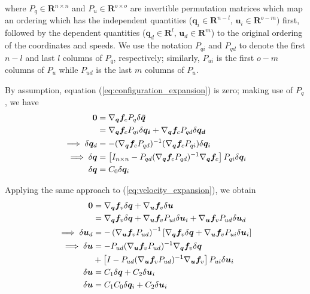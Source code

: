 \documentclass[smallcondensed]{svjour3}                     %
\begin{document}
where $P_q \in \mathbf{R}^{n \times n}$ and $P_u \in \mathbf{R}^{o \times o}$
are invertible permutation matrices which map an ordering which has the
independent quantities ($\bm{q}_{i}\in\mathbf{R}^{n-l},\,
\bm{u}_{i}\in\mathbf{R}^{o-m})$ first, followed by the dependent quantities
($\bm{q}_{d}\in\mathbf{R}^{l},\, \bm{u}_{d}\in\mathbf{R}^{m}$) to the
original ordering of the coordinates and speeds.  We use the notation $P_{qi}$
and $P_{qd}$ to denote the first $n-l$ and last $l$ columns of $P_q$,
respectively; similarly, $P_{ui}$ is the first $o-m$ columns of $P_{u}$ while
$P_{ud}$ is the last $m$ columns of $P_u$.

By assumption, equation
(\ref{eq:configuration_expansion}) is zero; making use of $P_q$, we have
\begin{align}
  \bm{0} &= \nabla_{\bm{q}}\bm{f}_{c} P_{q} \delta \bm{\tilde{q}} \notag \\
   &= \nabla_{\bm{q}}\bm{f}_{c} P_{qi} \delta \bm{q_i} +
  \nabla_{\bm{q}}\bm{f}_{c} P_{qd} \delta \bm{q_d}\notag\\
  \implies \delta \bm{q}_d &= -(\nabla_{\bm{q}}\bm{f}_{c} P_{qd})^{-1}
  (\nabla_{\bm{q}}\bm{f}_{c} P_{qi}) \delta \bm{q}_i \notag\\
  \implies \delta \bm{q} &= \left[ I_{n \times n} - P_{qd}(\nabla_{\bm{q}}
    \bm{f}_{c} P_{qd})^{-1} \nabla_{\bm{q}} \bm{f}_{c} \right] P_{qi} \delta
    \bm{q}_i\\
  \label{eq:delta_q}
  \delta \bm{q} &= C_0 \delta \bm{q}_i
\end{align}

Applying the same approach to (\ref{eq:velocity_expansion}), we obtain
\begin{align}
  \bm{0} &= \nabla_{\bm{q}}\bm{f}_{v} \delta \bm{q} +
  \nabla_{\bm{u}}\bm{f}_{v} \delta \bm{u}\notag\\
  &= \nabla_{\bm{q}} \bm{f}_{v}
\delta \bm{q} + \nabla_{\bm{u}} \bm{f}_{v} P_{ui} \delta \bm{u}_i +
\nabla_{\bm{u}} \bm{f}_{v} P_{ud} \delta \bm{u}_d \notag\\
\implies \delta \bm{u}_d &= -\left(\nabla_{\bm{u}} \bm{f}_{v}
P_{ud}\right)^{-1}\left[\nabla_{\bm{q}}\bm{f}_{v} \delta\bm{q} +
  \nabla_{\bm{u}} \bm{f}_{v} P_{ui} \delta \bm{u}_i \right]\notag\\
  \implies \delta \bm{u} &= -P_{ud}(\nabla_{\bm{u}} \bm{f}_{v} P_{ud})^{-1}
  \nabla_{\bm{q}} \bm{f}_{v} \delta \bm{q}\notag\\
  &+ \left[I - P_{ud} (\nabla_{\bm{u}}\bm{f}_{v} P_{ud})^{-1} \nabla_{\bm{u}}
    \bm{f}_{v} \right] P_{ui} \delta \bm{u}_i\\
  \delta \bm{u} &= C_1 \delta \bm{q} + C_2 \delta \bm{u}_i\notag\\
  \label{eq:delta_u}
  \delta \bm{u} &= C_1 C_0 \delta \bm{q}_i + C_2 \delta \bm{u}_i
\end{align}
\end{document}

